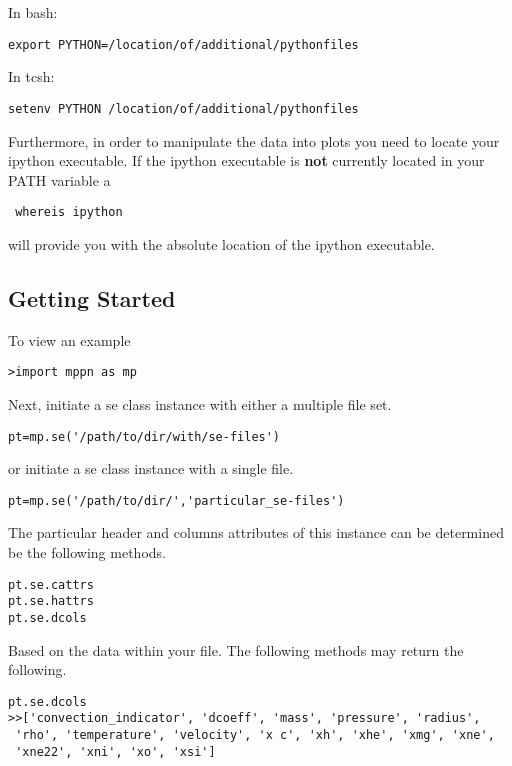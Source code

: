 In bash:

\begin{verbatim}
export PYTHON=/location/of/additional/pythonfiles
\end{verbatim}

In tcsh:

\begin{verbatim}
setenv PYTHON /location/of/additional/pythonfiles
\end{verbatim}


Furthermore, in order to manipulate the data into plots you need to locate your ipython executable.
If the ipython executable is {\bf not} currently  located in your PATH variable a
\newline
\begin{verbatim}
 whereis ipython
\end{verbatim}
will provide you with the absolute location of the ipython executable.  


\subsection{Getting Started}

To view an example
\begin{verbatim}
>import mppn as mp
\end{verbatim}

Next, initiate a se class instance with either a multiple file set.
\begin{verbatim}
pt=mp.se('/path/to/dir/with/se-files')
\end{verbatim}

or initiate a se class instance with a single file.
\begin{verbatim}
pt=mp.se('/path/to/dir/','particular_se-files')
\end{verbatim}


The particular header and columns attributes of this instance can be determined
be the following methods.

\begin{verbatim}
pt.se.cattrs
pt.se.hattrs
pt.se.dcols
\end{verbatim}

Based on the data within your file. The following methods may return the following.
\begin{verbatim}
pt.se.dcols
>>['convection_indicator', 'dcoeff', 'mass', 'pressure', 'radius',
 'rho', 'temperature', 'velocity', 'x c', 'xh', 'xhe', 'xmg', 'xne',
 'xne22', 'xni', 'xo', 'xsi']
\end{verbatim}



